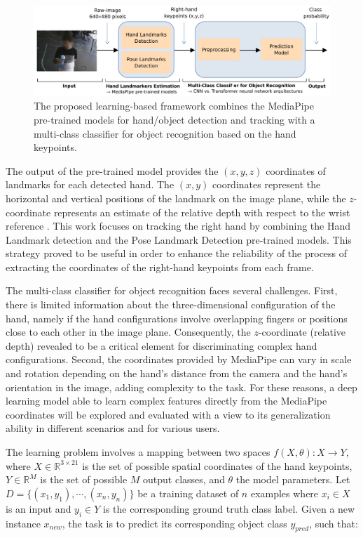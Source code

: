 \begin{figure}[ht]
    \centering
    \includegraphics[width=1\columnwidth]{figs/LearningFrameworkB.pdf}
    \caption{The proposed learning-based framework combines the MediaPipe pre-trained models for hand/object detection and tracking with a multi-class classifier for object recognition based on the hand keypoints.}
    \label{fig:LearningFramework}
\end{figure}

The output of the pre-trained model provides the $(x,y,z)$ coordinates of landmarks for each detected hand. The $(x,y)$ coordinates represent the horizontal and vertical positions of the landmark on the image plane, while the $z$-coordinate represents an estimate of the relative depth with respect to the wrist reference \cite{Amprimo2023}. This work focuses on tracking the right hand by combining the Hand Landmark detection and the Pose Landmark Detection pre-trained models. This strategy proved to be useful in order to enhance the reliability of the process of extracting the coordinates of the right-hand keypoints from each frame.

The multi-class classifier for object recognition faces several challenges. First, there is limited information about the three-dimensional configuration of the hand, namely if the hand configurations involve overlapping fingers or positions close to each other in the image plane. Consequently, the $z$-coordinate (relative depth) revealed to be a critical element for discriminating complex hand configurations. Second, the coordinates provided by MediaPipe can vary in scale and rotation depending on the hand’s distance from the camera and the hand’s orientation in the image, adding complexity to the task. For these reasons, a deep learning model able to learn complex features directly from the MediaPipe coordinates will be explored and evaluated with a view to its generalization ability in different scenarios and for various users. 

The learning problem involves a mapping between two spaces $f(X,\theta): X \rightarrow Y$, where $X \in \mathbb{R}^{3\times21}$ is the set of possible spatial coordinates of the hand keypoints, $Y \in \mathbb{R}^{M}$ is the set of possible $M$ output classes, and $\theta$ the model parameters. Let $D = \{(x_1,y_1),\cdots,(x_n,y_n)\}$ be a training dataset of $n$ examples where $x_i \in X$ is an input and $y_i \in Y$ is the corresponding ground truth class label. 
Given a new instance $x_{new}$, the task is to predict its corresponding object class $y_{pred}$, such that: 

